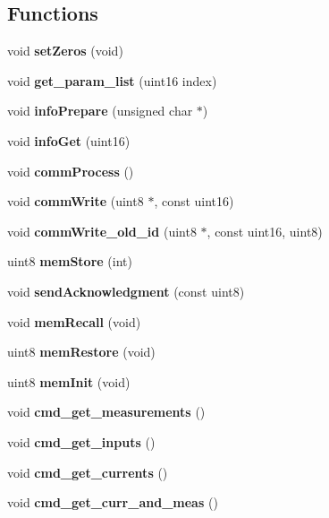 \subsection*{Functions}
\begin{DoxyCompactItemize}
\item 
\mbox{\label{command__processing_8h_abb781ac00e0752ce772a75f7b5d1a5b7}} 
void {\bfseries set\+Zeros} (void)
\item 
\mbox{\label{command__processing_8h_a5ef086c932682ca5f7549b74ead732aa}} 
void {\bfseries get\+\_\+param\+\_\+list} (uint16 index)
\item 
\mbox{\label{command__processing_8h_a6fda7bc0be24d261f9cb09e77616b1be}} 
void {\bfseries info\+Prepare} (unsigned char $\ast$)
\item 
\mbox{\label{command__processing_8h_a813734e69ea461791f84bddee422013f}} 
void {\bfseries info\+Get} (uint16)
\item 
\mbox{\label{command__processing_8h_a2e5d1711e19837adc3e8f479af3ae509}} 
void {\bfseries comm\+Process} ()
\item 
\mbox{\label{command__processing_8h_adeaad7a3965fdcfe78aa89533f1ebf39}} 
void {\bfseries comm\+Write} (uint8 $\ast$, const uint16)
\item 
\mbox{\label{command__processing_8h_af454a3663070706183ebf8f1ba784343}} 
void {\bfseries comm\+Write\+\_\+old\+\_\+id} (uint8 $\ast$, const uint16, uint8)
\item 
uint8 \textbf{ mem\+Store} (int)
\item 
\mbox{\label{command__processing_8h_afe5c87f9df9bb965976b5d40c4159f1f}} 
void {\bfseries send\+Acknowledgment} (const uint8)
\item 
void \textbf{ mem\+Recall} (void)
\item 
uint8 \textbf{ mem\+Restore} (void)
\item 
uint8 \textbf{ mem\+Init} (void)
\item 
void \textbf{ cmd\+\_\+get\+\_\+measurements} ()
\item 
\mbox{\label{command__processing_8h_a20db4694e8caa572ec479f73ce8b3b02}} 
void {\bfseries cmd\+\_\+get\+\_\+inputs} ()
\item 
\mbox{\label{command__processing_8h_aaf613e251c1e14fe4fffe3e9e033f9f7}} 
void {\bfseries cmd\+\_\+get\+\_\+currents} ()
\item 
\mbox{\label{command__processing_8h_a45a90a8455bfdb6a7f0e118da2c6f0a6}} 
void {\bfseries cmd\+\_\+get\+\_\+curr\+\_\+and\+\_\+meas} ()
\item 

\end{DoxyCompactItemize}
